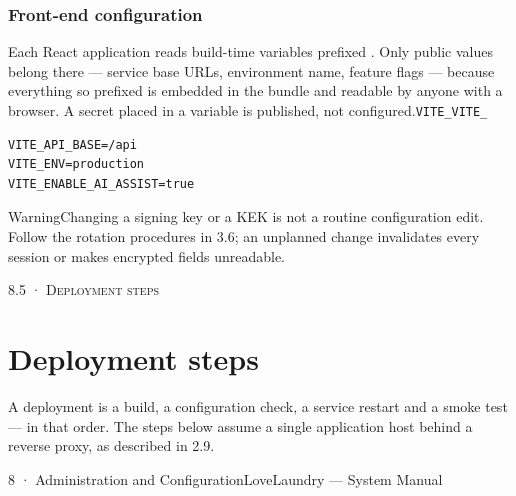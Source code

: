 \documentclass[11pt,a4paper,oneside]{book}
\begin{document}
\subsubsection*{Front-end configuration}
Each React application reads build-time variables prefixed . Only public values belong there — service base URLs, environment name, feature flags — because everything so prefixed is embedded in the bundle and readable by anyone with a browser. A secret placed in a  variable is published, not configured.\texttt{VITE\_}\texttt{VITE\_}

\begin{verbatim}
VITE_API_BASE=/api
VITE_ENV=production
VITE_ENABLE_AI_ASSIST=true
\end{verbatim}
\begin{notebox}WarningChanging a signing key or a KEK is not a routine configuration edit. Follow the rotation procedures in 3.6; an unplanned change invalidates every session or makes encrypted fields unreadable.\end{notebox}
\textsc{\small\color{crimson}8.5 · Deployment steps}\par\medskip
\section*{Deployment steps}
A deployment is a build, a configuration check, a service restart and a smoke test — in that order. The steps below assume a single application host behind a reverse proxy, as described in 2.9.

8 · Administration and ConfigurationLoveLaundry — System Manual
\end{document}
